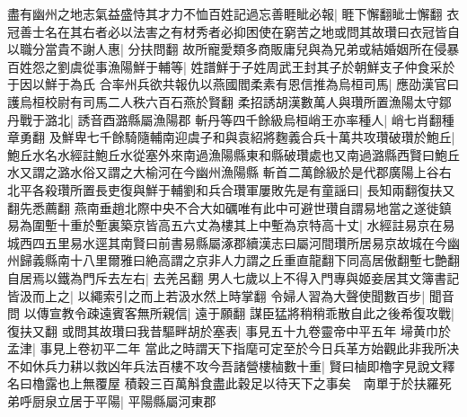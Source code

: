 盡有幽州之地志氣益盛恃其才力不恤百姓記過忘善睚眦必報|{
	睚下懈翻眦士懈翻}
衣冠善士名在其右者必以法害之有材秀者必抑困使在窮苦之地或問其故瓚曰衣冠皆自以職分當貴不謝人惠|{
	分扶問翻}
故所寵愛類多商販庸兒與為兄弟或結婚姻所在侵暴百姓怨之劉虞從事漁陽鮮于輔等|{
	姓譜鮮于子姓周武王封其子於朝鮮支子仲食采於于因以鮮于為氏}
合率州兵欲共報仇以燕國閻柔素有恩信推為烏桓司馬|{
	應劭漢官曰護烏桓校尉有司馬二人秩六百石燕於賢翻}
柔招誘胡漢數萬人與瓚所置漁陽太守鄒丹戰于潞北|{
	誘音酉潞縣屬漁陽郡}
斬丹等四千餘級烏桓峭王亦率種人|{
	峭七肖翻種章勇翻}
及鮮卑七千餘騎隨輔南迎虞子和與袁紹將麴義合兵十萬共攻瓚破瓚於鮑丘|{
	鮑丘水名水經註鮑丘水從塞外來南過漁陽縣東和縣破瓚處也又南過潞縣西賢曰鮑丘水又謂之潞水俗又謂之大榆河在今幽州漁陽縣}
斬首二萬餘級於是代郡廣陽上谷右北平各殺瓚所置長吏復與鮮于輔劉和兵合瓚軍屢敗先是有童謡曰|{
	長知兩翻復扶又翻先悉薦翻}
燕南垂趙北際中央不合大如礪唯有此中可避世瓚自謂易地當之遂徙鎮易為圍塹十重於塹裏築京皆高五六丈為樓其上中塹為京特高十丈|{
	水經註易京在易城西四五里易水逕其南賢曰前書易縣屬涿郡續漢志曰屬河間瓚所居易京故城在今幽州歸義縣南十八里爾雅曰絶高謂之京非人力謂之丘重直龍翻下同高居傲翻塹七艶翻}
自居焉以鐵為門斥去左右|{
	去羌呂翻}
男人七歲以上不得入門專與姬妾居其文簿書記皆汲而上之|{
	以繩索引之而上若汲水然上時掌翻}
令婦人習為大聲使聞數百步|{
	聞音問}
以傳宣教令疎遠賓客無所親信|{
	遠于願翻}
謀臣猛將稍稍乖散自此之後希復攻戰|{
	復扶又翻}
或問其故瓚曰我昔驅畔胡於塞表|{
	事見五十九卷靈帝中平五年}
埽黄巾於孟津|{
	事見上卷初平二年}
當此之時謂天下指麾可定至於今日兵革方始觀此非我所决不如休兵力耕以救凶年兵法百樓不攻今吾諸營樓樐數十重|{
	賢曰樐即櫓字見說文釋名曰櫓露也上無覆屋}
積穀三百萬斛食盡此穀足以待天下之事矣　南單于於扶羅死弟呼厨泉立居于平陽|{
	平陽縣屬河東郡}


